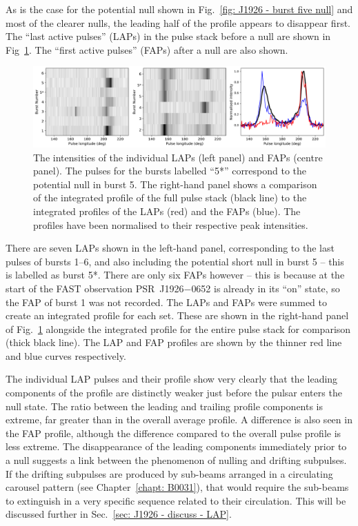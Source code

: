 As is the case for the potential null shown in Fig.~\ref{fig: J1926 - burst five null} and most of the clearer nulls, the leading half of the profile appears to disappear first. The ``last active pulses'' (LAPs) in the pulse stack before a null are shown in Fig~\ref{fig: J1926 - LAP and FAP profiles}. The ``first active pulses'' (FAPs) after a null are also shown. 
\begin{figure}
    \begin{center}
        \includegraphics[width=1.0\textwidth]{Figures/J1926/LAPFAP_profiles}
        \caption[Comparison of LAP and FAP to integrated profile]{The intensities of the individual LAPs (left panel) and FAPs (centre panel). The pulses for the bursts labelled ``5*'' correspond to the potential null in burst 5. The right-hand panel shows a comparison of the integrated profile of the full pulse stack (black line) to the integrated profiles of the LAPs (red) and the FAPs (blue). The profiles have been normalised to their respective peak intensities. }
        \label{fig: J1926 - LAP and FAP profiles}
    \end{center}
\end{figure}
There are seven LAPs shown in the left-hand panel, corresponding to the last pulses of bursts 1--6, and also including the potential short null in burst 5 -- this is labelled as burst 5*. There are only six FAPs however -- this is because at the start of the FAST observation PSR~J1926$-$0652 is already in its ``on'' state, so the FAP of burst 1 was not recorded. The LAPs and FAPs were summed to create an integrated profile for each set. These are shown in the right-hand panel of Fig.~\ref{fig: J1926 - LAP and FAP profiles} alongside the integrated profile for the entire pulse stack for comparison (thick black line). The LAP and FAP profiles are shown by the thinner red line and blue curves respectively.

The individual LAP pulses and their profile show very clearly that the leading components of the profile are distinctly weaker just before the pulsar enters the null state. The ratio between the leading and trailing profile components is extreme, far greater than in the overall average profile. A difference is also seen in the FAP profile, although the difference compared to the overall pulse profile is less extreme. The disappearance of the leading components immediately prior to a null suggests a link between the phenomenon of nulling and drifting subpulses. If the drifting subpulses are produced by sub-beams arranged in a circulating carousel pattern (see Chapter~\ref{chapt: B0031}), that would require the sub-beams to extinguish in a very specific sequence related to their circulation. This will be discussed further in Sec.~\ref{sec: J1926 - discuss - LAP}.

